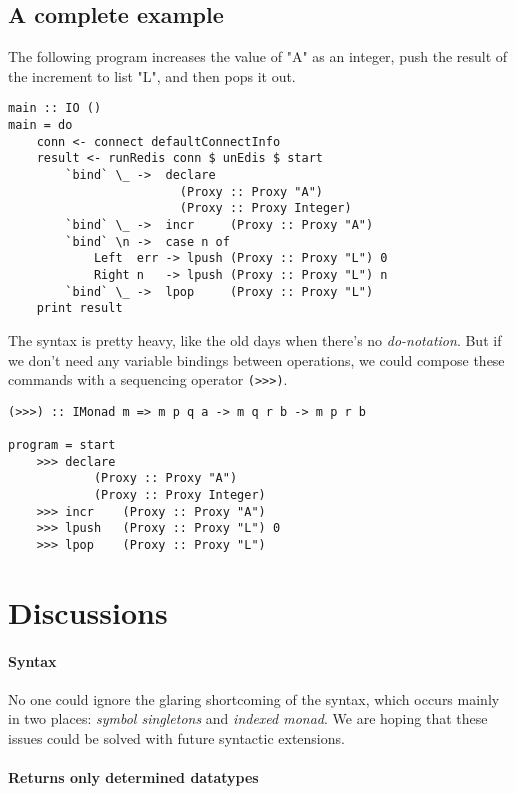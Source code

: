 \documentclass[pldi]{sigplanconf-pldi16}
\begin{document}
\subsection{A complete example}

The following program increases the value of "A" as an integer, push the result
 of the increment to list "L", and then pops it out.

\begin{verbatim}
main :: IO ()
main = do
    conn <- connect defaultConnectInfo
    result <- runRedis conn $ unEdis $ start
        `bind` \_ ->  declare
                        (Proxy :: Proxy "A")
                        (Proxy :: Proxy Integer)
        `bind` \_ ->  incr     (Proxy :: Proxy "A")
        `bind` \n ->  case n of
            Left  err -> lpush (Proxy :: Proxy "L") 0
            Right n   -> lpush (Proxy :: Proxy "L") n
        `bind` \_ ->  lpop     (Proxy :: Proxy "L")
    print result
\end{verbatim}

The syntax is pretty heavy, like the old days when there's no
 \emph{do-notation}\cite{history}. But if we don't need any variable bindings
 between operations, we could compose these commands with a sequencing operator
 \texttt{(>>>)}.

\begin{verbatim}
(>>>) :: IMonad m => m p q a -> m q r b -> m p r b

program = start
    >>> declare
            (Proxy :: Proxy "A")
            (Proxy :: Proxy Integer)
    >>> incr    (Proxy :: Proxy "A")
    >>> lpush   (Proxy :: Proxy "L") 0
    >>> lpop    (Proxy :: Proxy "L")
\end{verbatim}

\section{Discussions}
\paragraph{Syntax}
No one could ignore the glaring shortcoming of the syntax, which occurs mainly
 in two places: \emph{symbol singletons} and \emph{indexed monad}. We are hoping
 that these issues could be solved with future syntactic extensions.

\paragraph{Returns only determined datatypes}
\end{document}
